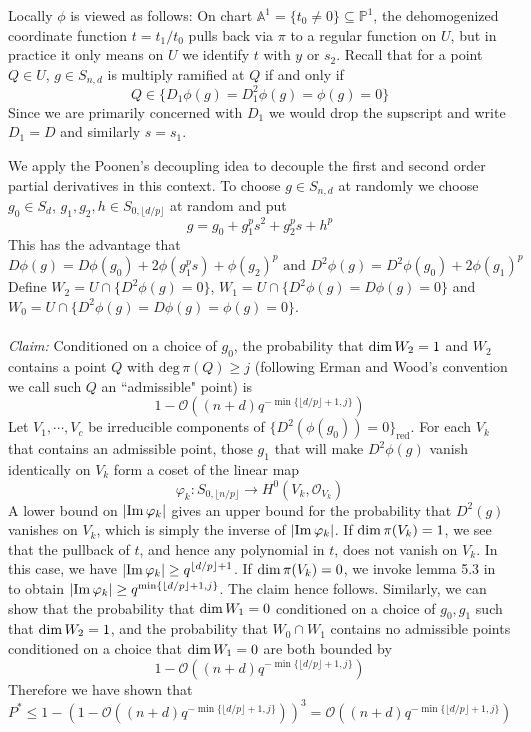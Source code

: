\documentclass[12pt]{article}
\theoremstyle{plain}
\theoremstyle{definition}
\newcommand{\IA}{\mathbb{A}}
\newcommand{\IP}{\mathbb{P}}
\newcommand{\sO}{\mathcal{O}}
\renewcommand{\deg}{\mathrm{deg}\,}
\renewcommand\dim{{\rm dim\,}}
\newcommand{\im}{{\rm Im\,}}
\newcommand{\<}{\langle}
\renewcommand{\>}{\rangle}
\begin{document}
Locally $\phi$ is viewed as follows: On chart $\IA^1 = \{t_0 \neq 0 \} \subseteq \IP^1$, the dehomogenized coordinate function $t = t_1/t_0$ pulls back via $\pi$ to a regular function on $U$, but in practice it only means on $U$ we identify $t$ with $y$ or $s_2$. Recall that for a point $Q \in U$, $g \in S_{n, d}$ is multiply ramified at $Q$ if and only if $$Q \in \{ D_1 \phi(g) = D_1^2 \phi(g) = \phi(g) = 0 \}$$ Since we are primarily concerned with $D_1$ we would drop the supscript and write $D_1 = D$ and similarly $s = s_1$. 

We apply the Poonen's decoupling idea to decouple the first and second order partial derivatives in this context. To choose $g \in S_{n, d}$ at randomly we choose $g_0 \in S_d$, $g_1, g_2, h \in S_{0, \lfloor d/p \rfloor} $ at random and put 
$$ g = g_0 + g_1^p s^2 + g_2^p s + h^p $$ This has the advantage that 
$$ D \phi(g) = D \phi(g_0) + 2 \phi(g_1^p s) + \phi(g_2)^p \text{ and } D^2 \phi(g) = D^2 \phi(g_0) + 2 \phi(g_1)^p $$
Define $W_2 = U \cap \{ D^2 \phi(g) = 0 \}$, $W_1 = U \cap \{D^2 \phi(g) = D \phi(g) = 0\}$ and $W_0 = U \cap \{ D^2 \phi(g) = D \phi(g) = \phi(g) = 0\}$. \\\\
\textit{Claim: }Conditioned on a choice of $g_0$, the probability that $\dim W_2 = 1$ and $W_2$ contains a point $Q$ with $\deg \pi(Q) \ge j$ (following Erman and Wood's convention we call such $Q$ an ``admissible" point) is $$1 - \sO((n + d)q^{- \min\{ \lfloor d/p \rfloor + 1, j\}})$$ Let $V_1, \cdots, V_c$ be irreducible components of $\{D^2(\phi(g_0)) = 0\}_{\mathrm{red}}$. For each $V_k$ that contains an admissible point, those $g_1$ that will make $D^2 \phi(g)$ vanish identically on $V_k$ form a coset of the linear map $$ \varphi_k : S_{0, \lfloor n/p \rfloor} \to H^0(V_k, \sO_{V_k})$$ A lower bound on $|\im \varphi_k|$ gives an upper bound for the probability that $D^2(g)$ vanishes on $V_k$, which is simply the inverse of $|\im \varphi_k|$. If $\dim \pi(V_k) = 1$, we see that the pullback of $t$, and hence any polynomial in $t$, does not vanish on $V_k$. In this case, we have $|\im \varphi_k| \ge q^{\lfloor d/p \rfloor + 1}$. If $\dim \pi(V_k) = 0$, we invoke lemma 5.3 in \cite{Wood} to obtain $|\im \varphi_k| \ge q^{\min \{\lfloor d/p \rfloor + 1, j \}  }$. The claim hence follows. Similarly, we can show that the probability that $\dim W_1 = 0$ conditioned on a choice of $g_0, g_1$ such that $\dim W_2 = 1$, and the probability that $W_0 \cap W_1$ contains no admissible points conditioned on a choice that $\dim W_1 = 0$ are both bounded by $$1 - \sO((n + d)q^{- \min\{ \lfloor d/p \rfloor + 1, j\}})$$
Therefore we have shown that 
$$ P^* \le 1 - (1 - \sO((n + d)q^{- \min\{ \lfloor d/p \rfloor + 1, j\}}))^3 = \sO((n + d)q^{- \min\{ \lfloor d/p \rfloor + 1, j\}}) $$ 
\end{document}
